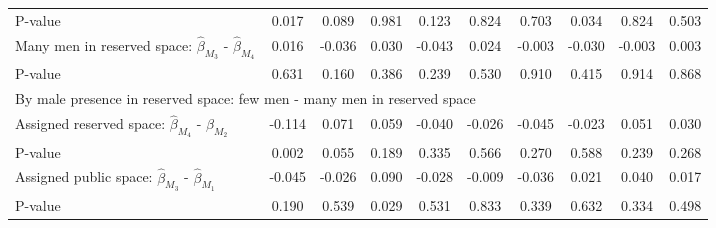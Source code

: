 \begin{tabular}{l*{9}{c}}
\quad P-value       &       0.017         &       0.089         &       0.981         &       0.123         &       0.824         &       0.703         &       0.034         &       0.824         &       0.503         \\
\quad Many men in reserved space: $\hat\beta_{M_3}$ - $\hat\beta_{M_4}$&       0.016         &      -0.036         &       0.030         &      -0.043         &       0.024         &      -0.003         &      -0.030         &      -0.003         &       0.003         \\
\quad P-value       &       0.631         &       0.160         &       0.386         &       0.239         &       0.530         &       0.910         &       0.415         &       0.914         &       0.868         \\
\multicolumn{10}{l}{By male presence in reserved space: few men - many men in reserved space} \\ \quad Assigned reserved space: $\hat\beta_{M_4}$ - $\hat\beta_{M_2}$&      -0.114         &       0.071         &       0.059         &      -0.040         &      -0.026         &      -0.045         &      -0.023         &       0.051         &       0.030         \\
\quad P-value       &       0.002         &       0.055         &       0.189         &       0.335         &       0.566         &       0.270         &       0.588         &       0.239         &       0.268         \\
\quad Assigned public space: $\hat\beta_{M_3}$ - $\hat\beta_{M_1}$&      -0.045         &      -0.026         &       0.090         &      -0.028         &      -0.009         &      -0.036         &       0.021         &       0.040         &       0.017         \\
\quad P-value       &       0.190         &       0.539         &       0.029         &       0.531         &       0.833         &       0.339         &       0.632         &       0.334         &       0.498         \\
\hline\hline \end{tabular}
